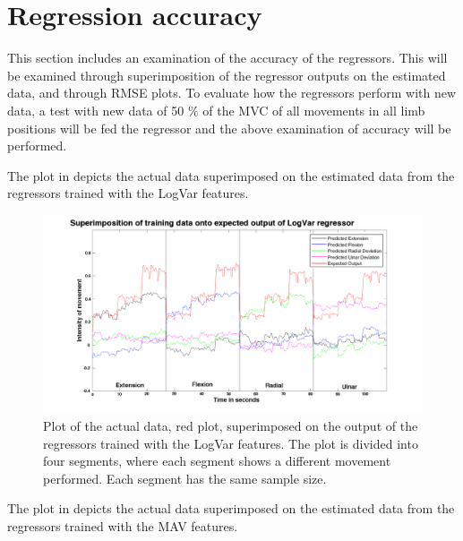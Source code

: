 \section{Regression accuracy}
This section includes an examination of the accuracy of the regressors. This will be examined through superimposition of the regressor outputs on the estimated data, and through RMSE plots. To evaluate how the regressors perform with new data, a test with new data of 50 $\%$ of the MVC of all movements in all limb positions will be fed the regressor and the above examination of accuracy will be performed. 

The plot in  depicts the actual data superimposed on the estimated data from the regressors trained with the LogVar features. 

\begin{figure}[H]
	\includegraphics[width=1\textwidth]{figures/results/NewSuperPositionTestDataLogVar}  %
	\caption{Plot of the actual data, red plot, superimposed on the output of the regressors trained with the LogVar features. The plot is divided into four segments, where each segment shows a different movement performed. Each segment has the same sample size.}
	\label{fig:SuperPositionTestDataLogVar}  %
\end{figure}

The plot in  depicts the actual data superimposed on the estimated data from the regressors trained with the MAV features. 

